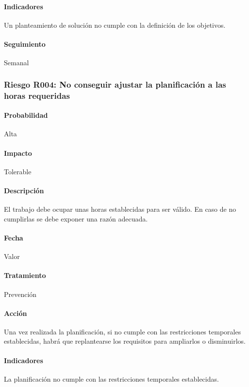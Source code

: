 \documentclass[10pt,a4paper]{article}
\begin{document}
				\paragraph{Indicadores} Un planteamiento de solución no cumple con la definición de los objetivos. %
				\paragraph{Seguimiento}	Semanal %
				
			\subsubsection{Riesgo R004: No conseguir ajustar la planificación a las horas requeridas }
				\paragraph{Probabilidad} Alta
				\paragraph{Impacto}	Tolerable
				\paragraph{Descripción} El trabajo debe ocupar unas horas establecidas para ser válido. En caso de no cumplirlas se debe exponer una razón adecuada.
				\paragraph{Fecha} Valor %
				\paragraph{Tratamiento} Prevención %
				\paragraph{Acción} Una vez realizada la planificación, si no cumple con las restricciones temporales establecidas, habrá que replantearse los requisitos para ampliarlos o disminuirlos.  %
				\paragraph{Indicadores} La planificación no cumple con las restricciones temporales establecidas. %
				
\end{document}
